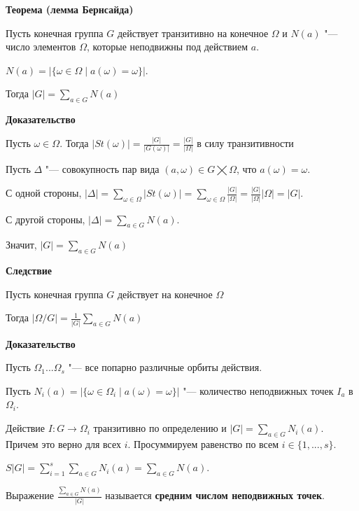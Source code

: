 \documentclass{article}
\begin{document}
\vspace{10pt}

\textbf{Теорема (лемма Бернсайда)}

Пусть конечная группа $G$ действует транзитивно на конечное $\Omega$ и $N(a)$ "--- число элементов $\Omega$, которые неподвижны под действием $a$.

$N(a) = |\{\omega \in \Omega \mid a(\omega) = \omega\}|$. 

Тогда $|G| = \sum \limits_{a \in G} N(a)$

\vspace{5pt}

\textbf{Доказательство}

Пусть $\omega \in \Omega$. Тогда $|St(\omega)| = \frac{|G|}{|G(\omega)|} = \frac{|G|}{|\Omega|}$ в силу транзитивности

Пусть $\Delta$ "--- совокупность пар вида $(a, \omega) \in G \bigtimes \Omega$, что $a(\omega) = \omega$.

С одной стороны, $|\Delta| = \sum \limits_{\omega \in \Omega} |St(\omega)| = \sum \limits_{\omega \in \Omega} \frac{|G|}{|\Omega|} = \frac{|G|}{|\Omega|}|\Omega| = |G|$.

С другой стороны, $|\Delta| = \sum \limits_{a \in G} N(a)$. 

Значит, $|G| = \sum \limits_{a \in G} N(a)$ 

\vspace{10pt}

\textbf{Следствие}

Пусть конечная группа $G$ действует на конечное $\Omega$

Тогда $|\Omega / G| = \frac{1}{|G|} \sum \limits_{a \in G} N(a)$

\textbf{Доказательство}

Пусть $\Omega_1 ... \Omega_s$ "--- все попарно различные орбиты действия.

Пусть $N_i(a) = |\{\omega \in \Omega_i \mid a(\omega) = \omega\}|$ "--- количество неподвижных точек $I_a$ в $\Omega_i$.

Действие $I : G \rightarrow \Omega_i$ транзитивно по определению и $|G| = \sum \limits_{a \in G} N_i(a)$. Причем это верно для всех $i$. Просуммируем равенство по всем $i \in \{1, ..., s\}$.

$S|G| = \sum \limits_{i = 1}^s \sum \limits_{a \in G} N_i(a) = \sum \limits_{a \in G} N(a)$.

Выражение $\frac{\sum \limits_{a \in G} N(a)}{|G|}$ называется \textbf{средним числом неподвижных точек}.
\end{document}
